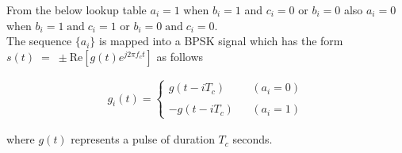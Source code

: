 From the below lookup table $a_i=1$ when $b_i=1$ and $c_i=0$ or $b_i=0$ also $a_i=0$ when $b_i=1\; \mathrm{and}\;c_i=1$ or $b_i=0\;\mathrm{and}\;c_i=0$. \\

The sequence $\{a_i\}$ is mapped into a BPSK signal which has the form $s(t)\;=\;\pm \mathrm{Re}\left [ g(t)e^{j2\pi f_c t} \right ]$ as follows 

\begin{eqnarray}
g_i(t)=\left \{
\begin{array}{rll}
g(t-iT_c)&&(a_i=0)\\ \\
-g(t-iT_c)&&(a_i=1)
\end{array}
\right .
\end{eqnarray}

where $g(t)$ represents a pulse of duration $T_c$ seconds.
